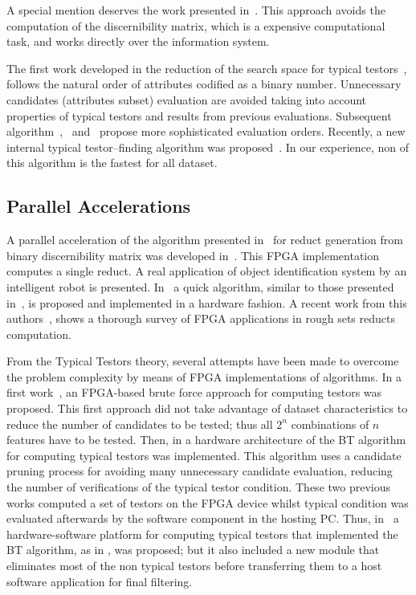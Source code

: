 \documentclass[11pt]{article}   %
\begin{document}
  A special mention deserves the work presented in~\cite{WangP07}. This approach avoids the computation of the
  discernibility matrix, which is a expensive computational task, and works directly over the information system. 
 
  The first work developed in the reduction of the search space for typical testors~\cite{Ruiz85}, follows 
  the natural order of attributes codified as a binary number. Unnecessary candidates (attributes subset)
  evaluation are avoided taking into account properties of typical testors and results from previous 
  evaluations. Subsequent algorithm~\cite{Santiesteban03},~\cite{Sanchez07} and~\cite{Lias09} propose
  more sophisticated evaluation orders. Recently, a new internal typical testor--finding algorithm was
  proposed~\cite{Alba14}. In our experience, non of this algorithm is the fastest for all dataset.
  
\subsection{Parallel Accelerations}

  A parallel acceleration of the algorithm presented in~\cite{Yang08} for reduct generation from binary
  discernibility matrix was developed in~\cite{Tiwari11,Tiwari12}. This FPGA implementation computes a 
  single reduct. A real application of object identification system by an intelligent robot is presented.
  In~\cite{Tiwari13} a quick algorithm, similar to those presented in~\cite{Chouchoulas01}, is proposed
  and implemented in a hardware fashion. A recent work from this authors~\cite{Tiwari14}, shows a thorough
  survey of FPGA applications in rough sets reducts computation.

  From the Typical Testors theory, several attempts have been made to overcome the problem 
  complexity by means of FPGA implementations of algorithms. In a first work~\cite{Cumplido06}, an 
  FPGA-based brute force approach for computing testors was proposed. This first approach did 
  not take advantage of dataset characteristics to reduce the number of candidates to be tested; 
  thus all $2^n$ combinations of $n$ features have to be tested. Then, in \cite{Rojas07} a hardware 
  architecture of the BT algorithm for computing typical testors was implemented. 
  This algorithm uses a candidate pruning process for avoiding many unnecessary candidate evaluation, 
  reducing the number of verifications of the typical testor condition. These two previous works computed 
  a set of testors on the FPGA device whilst typical condition was evaluated afterwards by the 
  software component in the hosting PC. Thus, in~\cite{Rojas12} a hardware-software platform for 
  computing typical testors that implemented the BT algorithm, as in \cite{Rojas07}, was proposed; but it also 
  included a new module that eliminates most of the non typical testors before transferring them to 
  a host software application for final filtering. 
	
\end{document}
